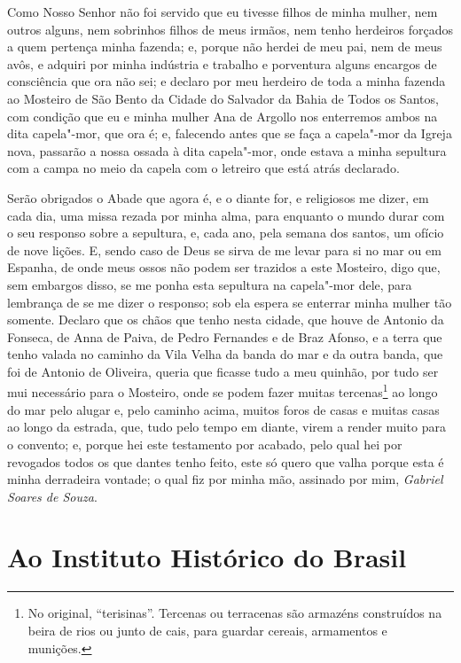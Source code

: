 \begin{linenumbers}
 Como Nosso Senhor não foi servido que eu tivesse filhos de minha
mulher, nem outros alguns, nem sobrinhos filhos de meus irmãos, nem
tenho herdeiros forçados a quem pertença minha fazenda; e, porque não
herdei de meu pai, nem de meus avôs, e adquiri por minha indústria e
trabalho e porventura alguns encargos de consciência que ora não sei; e
declaro por meu herdeiro de toda a minha fazenda ao Mosteiro de São
Bento da Cidade do Salvador da Bahia de Todos os Santos, com condição
que eu e minha mulher Ana de Argollo nos enterremos ambos na dita
capela"-mor, que ora é; e, falecendo antes que se faça a capela"-mor da
Igreja nova, passarão a nossa ossada à dita capela"-mor, onde estava a
minha sepultura com a campa no meio da capela com o letreiro que está atrás
declarado.

Serão obrigados o Abade que agora é, e o diante for, e religiosos me
dizer, em cada dia, uma missa rezada por minha alma, para enquanto o
mundo durar com o seu responso sobre a sepultura, e, cada ano, pela
semana dos santos, um ofício de nove lições. E, sendo caso de Deus se
sirva de me levar para si no mar ou em Espanha, de onde meus ossos não
podem ser trazidos a este Mosteiro, digo que, sem embargos disso, se me
ponha esta sepultura na capela"-mor dele, para lembrança de se me dizer
o responso; sob ela espera se enterrar minha mulher tão somente.
Declaro que os chãos que tenho nesta cidade, que houve de Antonio da	\EP[-1]
Fonseca, de Anna de Paiva, de Pedro Fernandes e de Braz Afonso, e a
terra que tenho valada no caminho da Vila Velha da banda do mar e da
outra banda, que foi de Antonio de Oliveira, queria que ficasse tudo a
meu quinhão, por tudo ser mui necessário para o Mosteiro, onde se podem
fazer muitas tercenas\footnote{ No original, “terisinas”. Tercenas ou
terracenas são armazéns construídos na beira de rios ou junto de cais,
para guardar cereais, armamentos e munições.} ao longo do mar pelo
alugar e, pelo caminho acima, muitos foros de casas e muitas casas ao
longo da estrada, que, tudo pelo tempo em diante, virem a render muito
para o convento; e, porque hei este testamento por acabado, pelo qual
hei por revogados todos os que dantes tenho feito, este só quero que
valha porque esta é minha derradeira vontade; o qual fiz por minha mão,
assinado por mim, \textit{Gabriel Soares de Souza}. 

\end{linenumbers}

\chapter[Ao Instituto Histórico do Brasil]{Ao Instituto Histórico do Brasil}

